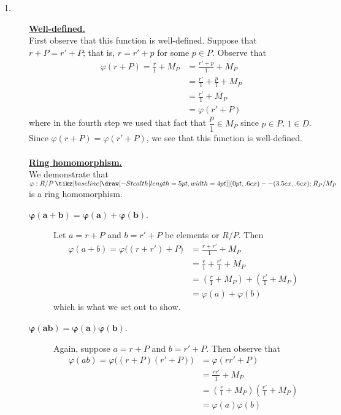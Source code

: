 \documentclass[12pt,letterpaper]{algebra_book}
\renewcommand{\to}{\mathbin{\tikz[baseline] \draw[-{Stealth[length=5pt,width=4pt]}] (0pt,.6ex) -- (3.5ex,.6ex);}}
\renewcommand{\phi}{\varphi}
\theoremstyle{definition}
\begin{document}
\begin{prf}
    \begin{description}
    \item[1.]     \underline{\textbf{Well-defined.}}\\ First observe that this function is
    well-defined. Suppose that $r + P = r' + P$; that is, $r = r'
    + p$ for some $p \in P$. Observe that 
    \begin{align*}
        \phi(r + P) = \frac{r}{1} + M_P
        &= \frac{r' + p}{1} + M_P\\
        &= \frac{r'}{1} + \frac{p}{1} + M_P\\
        &= \frac{r'}{1} + M_P\\
        &= \phi(r' + P)
    \end{align*}
    where in the fourth step we used that fact that $\dfrac{p}{1}
    \in M_P$ since $p \in P$, $1 \in D$. Since $\phi(r + P) =
    \phi(r' + P)$, we see that
    this function is well-defined. 
    \\
    \\
    \underline{\textbf{Ring homomorphism.}}\\
    We demonstrate that $\phi: R/P \to R_P/M_P$ is a ring
    homomorphism. 
    \begin{description}
        \item[$\bm{\phi(a + b) = \phi(a) + \phi(b)}$.]
        Let $a = r + P$ and $b = r' + P$ be elements or $R/P$.
        Then
        \begin{align*}
            \phi(a + b) = \phi\big((r + r') + P \big)
            & = \frac{r + r'}{1} + M_P\\
            & = \frac{r}{1} + \frac{r'}{1} + M_P\\
            & = \left( \frac{r}{1} + M_P\right) + \left(\frac{r'}{1} + M_P\right)\\
            & = \phi(a) + \phi(b)
        \end{align*}    
        which is what we set out to show.
        \item[$\bm{\phi(ab) = \phi(a)\phi(b)}$.] Again, suppose $a
        = r + P$ and $b = r' + P$. Then observe that 
        \begin{align*}
            \phi(ab) = \phi\big( (r + P)(r' + P) \big) & = \phi(rr' + P)\\
            & = \frac{rr'}{1} + M_P\\
            & = \left(\frac{r}{1} + M_P\right)\left(\frac{r'}{1} + M_P\right)\\
            & = \phi(a)\phi(b)

\end{align*}
\end{description}
\end{description}
\end{prf}
\end{document}
